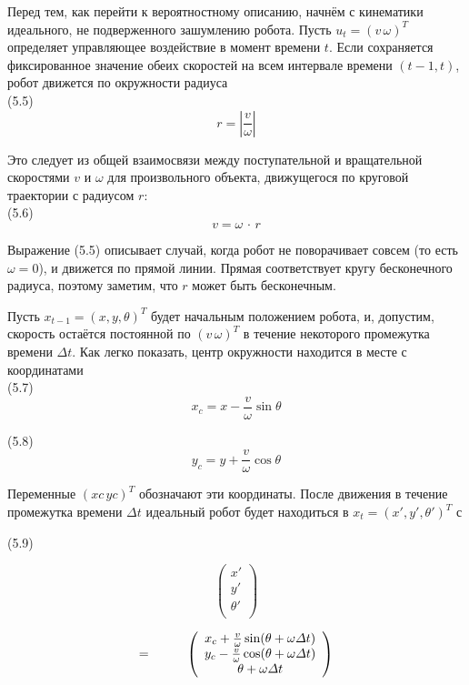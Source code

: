 \documentclass[10pt,a4paper]{article}
\begin{document}
Перед тем, как перейти к вероятностному описанию, начнём с кинематики идеального, не подверженного зашумлению робота. Пусть $u_t = (v\,\omega)^T$ определяет управляющее воздействие в момент времени $t$. Если сохраняется фиксированное значение обеих скоростей на всем интервале времени $(t-1,t)$,
робот движется по окружности радиуса\\

(5.5)
$$r=\left| \frac{v}{\omega}\right| $$

Это следует из общей взаимосвязи между поступательной и вращательной скоростями $v$ и $\omega$ для произвольного объекта, движущегося по круговой траектории с радиусом $r$:\\

(5.6)
$$v=\omega\,\cdot\,r$$

Выражение (5.5) описывает случай, когда робот не поворачивает совсем (то есть
$\omega = 0$), и движется по прямой линии. Прямая соответствует кругу бесконечного радиуса, поэтому заметим, что $r$ может быть бесконечным.

Пусть $x_{t-1} = (x,y,\theta)^T$  будет начальным положением робота, и, допустим, скорость остаётся постоянной по $(v\,\omega)^T$ в течение некоторого промежутка времени $\varDelta t$. Как легко показать, центр окружности находится в месте с координатами\\

(5.7)
$$x_c=x-\frac{v}{\omega}\sin\theta$$

(5.8)
$$y_c=y+\frac{v}{\omega}\cos\theta$$

Переменные $(xc\, yc)^T$ обозначают эти координаты. После движения в течение промежутка времени $\varDelta t$ идеальный робот будет находиться в $x_t = (x',y',\theta')^T$ с

(5.9)
\begin{minipage}{0.3\textwidth}
	\begin{equation*}
	\left(\begin{array}{c}
	x'\\
	y'\\
	\theta'\\
	\end{array}\right)
	\end{equation*}
\end{minipage}
\begin{minipage}{0.3\textwidth}
	\begin{equation*}
	\mbox {=} \hspace{10mm} 
	\left(\begin{array}{c}
	x_c+\frac{v}{\omega}\sin(\theta+\omega\varDelta t)\\
	y_c-\frac{v}{\omega}\cos(\theta+\omega\varDelta t)\\
	\theta+\omega\varDelta t\\
	\end{array}\right)
	\end{equation*}
\end{minipage}\\
\end{document}
